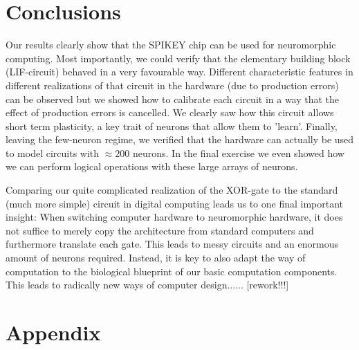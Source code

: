 \documentclass[a4paper,twocolumn]{article}
\begin{document}
\section{Conclusions}
Our results clearly show that the SPIKEY chip can be used for neuromorphic
computing. Most importantly,  we could verify that the elementary building
block (LIF-circuit) behaved in a very favourable way. Different characteristic
features in different realizations of that circuit in the hardware (due to 
production errors) can be observed but we showed how to calibrate each circuit
in a way that the effect of production errors is cancelled.  We clearly saw
how this circuit allows short term plasticity,  a key trait of neurons that
allow them to 'learn'.  Finally,  leaving the few-neuron regime,  we verified
that the hardware can actually be used to model circuits with $\approx 200$
neurons.  In the final exercise we even showed how we can perform logical
operations with these large arrays of neurons.\par
Comparing our quite complicated realization of the XOR-gate to the standard
(much more simple) circuit in digital computing leads us to one final important
insight: When switching computer hardware to neuromorphic hardware, it does
not suffice to merely copy the architecture from standard computers and
furthermore translate each gate.  This leads to messy circuits and an enormous
amount of neurons required.  Instead,  it is key to also adapt the way of
computation to the biological blueprint of our basic computation components.
This leads to radically new ways of computer design...... [rework!!!]





\section{Appendix}
\end{document}
